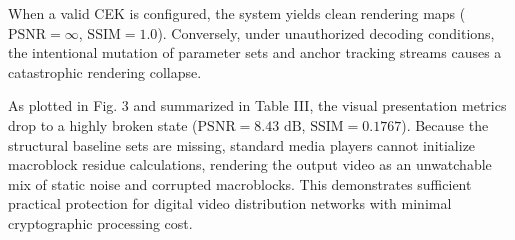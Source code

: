 When a valid CEK is configured, the system yields clean rendering maps ($\text{PSNR} = \infty$, $\text{SSIM} = 1.0$). Conversely, under unauthorized decoding conditions, the intentional mutation of parameter sets and anchor tracking streams causes a catastrophic rendering collapse. 

As plotted in Fig. 3 and summarized in Table III, the visual presentation metrics drop to a highly broken state ($\text{PSNR} = 8.43\text{ dB}$, $\text{SSIM} = 0.1767$). Because the structural baseline sets are missing, standard media players cannot initialize macroblock residue calculations, rendering the output video as an unwatchable mix of static noise and corrupted macroblocks. This demonstrates sufficient practical protection for digital video distribution networks with minimal cryptographic processing cost.